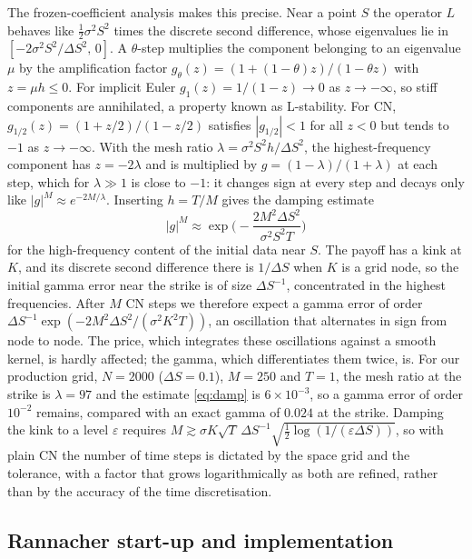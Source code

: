 \documentclass[11pt,a4paper]{article}
\begin{document}
The frozen-coefficient analysis makes this precise.
Near a point $S$ the operator $L$ behaves like $\frac12\sigma^2S^2$ times the discrete second difference, whose eigenvalues lie in $[-2\sigma^2S^2/\Delta S^2,\,0]$.
A $\theta$-step multiplies the component belonging to an eigenvalue $\mu$ by the amplification factor $g_\theta(z) = (1+(1-\theta)z)/(1-\theta z)$ with $z=\mu h\le0$.
For implicit Euler $g_1(z) = 1/(1-z)\to0$ as $z\to-\infty$, so stiff components are annihilated, a property known as L-stability.
For CN, $g_{1/2}(z) = (1+z/2)/(1-z/2)$ satisfies $|g_{1/2}|<1$ for all $z<0$ but tends to $-1$ as $z\to-\infty$.
With the mesh ratio $\lambda = \sigma^2S^2h/\Delta S^2$, the highest-frequency component has $z=-2\lambda$ and is multiplied by $g = (1-\lambda)/(1+\lambda)$ at each step, which for $\lambda\gg1$ is close to $-1$: it changes sign at every step and decays only like $|g|^M \approx e^{-2M/\lambda}$.
Inserting $h = T/M$ gives the damping estimate
\begin{equation}\label{eq:damp}
|g|^M \approx \exp\!\Big(-\frac{2M^2\Delta S^2}{\sigma^2S^2T}\Big)
\end{equation}
for the high-frequency content of the initial data near $S$.
The payoff has a kink at $K$, and its discrete second difference there is $1/\Delta S$ when $K$ is a grid node, so the initial gamma error near the strike is of size $\Delta S^{-1}$, concentrated in the highest frequencies.
After $M$ CN steps we therefore expect a gamma error of order $\Delta S^{-1}\exp(-2M^2\Delta S^2/(\sigma^2K^2T))$, an oscillation that alternates in sign from node to node.
The price, which integrates these oscillations against a smooth kernel, is hardly affected; the gamma, which differentiates them twice, is.
For our production grid, $N=2000$ ($\Delta S = 0.1$), $M=250$ and $T=1$, the mesh ratio at the strike is $\lambda = 97$ and the estimate \cref{eq:damp} is $6\times10^{-3}$, so a gamma error of order $10^{-2}$ remains, compared with an exact gamma of $0.024$ at the strike.
Damping the kink to a level $\varepsilon$ requires $M \gtrsim \sigma K\sqrt{T}\,\Delta S^{-1}\sqrt{\tfrac12\log(1/(\varepsilon\Delta S))}$, so with plain CN the number of time steps is dictated by the space grid and the tolerance, with a factor that grows logarithmically as both are refined, rather than by the accuracy of the time discretisation.

\subsection{Rannacher start-up and implementation}\label{sec:rannacher}
\end{document}
